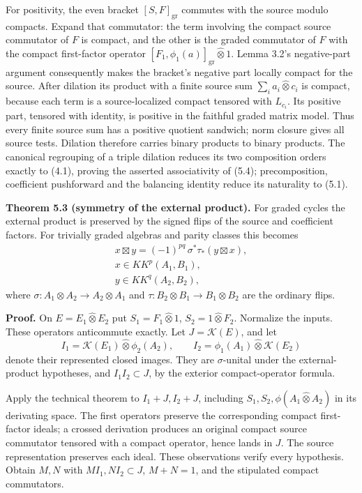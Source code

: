 \documentclass[
  11pt,
]{article}
\begin{document}
For positivity, the even bracket \([S,F]_{\mathrm{gr}}\) commutes with
the source modulo compacts. Expand that commutator: the term involving
the compact source commutator of \(F\) is compact, and the other is the
graded commutator of \(F\) with the compact first-factor operator
\([F_1,\phi_1(a)]_{\mathrm{gr}}\widehat\otimes1\). Lemma 3.2's
negative-part argument consequently makes the bracket's negative part
locally compact for the source. After dilation its product with a finite
source sum \(\sum_i a_i\widehat\otimes c_i\) is compact, because each
term is a source-localized compact tensored with \(L_{c_i}\). Its
positive part, tensored with identity, is positive in the faithful
graded matrix model. Thus every finite source sum has a positive
quotient sandwich; norm closure gives all source tests. Dilation
therefore carries binary products to binary products. The canonical
regrouping of a triple dilation reduces its two composition orders
exactly to (4.1), proving the asserted associativity of (5.4);
precomposition, coefficient pushforward and the balancing identity
reduce its naturality to (5.1).

\textbf{Theorem 5.3 (symmetry of the external product).} For graded
cycles the external product is preserved by the signed flips of the
source and coefficient factors. For trivially graded algebras and parity
classes this becomes \[
\begin{gathered}
x\boxtimes y=(-1)^{pq}\,\sigma^*\tau_*(y\boxtimes x),\\
x\in KK^p(A_1,B_1),\\
y\in KK^q(A_2,B_2),
\end{gathered}
\tag{5.5}
\] where \(\sigma:A_1\otimes A_2\to A_2\otimes A_1\) and
\(\tau:B_2\otimes B_1\to B_1\otimes B_2\) are the ordinary flips.

\textbf{Proof.} On \(E=E_1\widehat\otimes E_2\) put
\(S_1=F_1\widehat\otimes1\), \(S_2=1\widehat\otimes F_2\). Normalize the
inputs. These operators anticommute exactly. Let \(J=\mathcal K(E)\),
and let \[
I_1=\mathcal K(E_1)\widehat\otimes\phi_2(A_2),\qquad
I_2=\phi_1(A_1)\widehat\otimes\mathcal K(E_2)
\] denote their represented closed images. They are \(\sigma\)-unital
under the external-product hypotheses, and \(I_1I_2\subset J\), by the
exterior compact-operator formula.

Apply the technical theorem to \(I_1+J,I_2+J\), including
\(S_1,S_2,\phi(A_1\widehat\otimes A_2)\) in its derivating space. The
first operators preserve the corresponding compact first-factor ideals;
a crossed derivation produces an original compact source commutator
tensored with a compact operator, hence lands in \(J\). The source
representation preserves each ideal. These observations verify every
hypothesis. Obtain \(M,N\) with \(M I_1,N I_2\subset J\), \(M+N=1\), and
the stipulated compact commutators.
\end{document}
